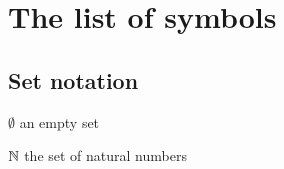 \chapter{The list of symbols}
\symbolsize=3.5cm%


\section*{Set notation}
\begin{symboly}
\item[$\emptyset$] an empty set
\item[$\mathbb{N}$] the set of natural numbers
\end{symboly}

